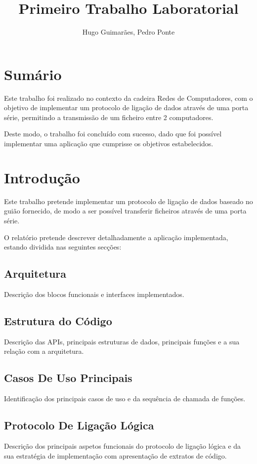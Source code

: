 \documentclass{article}
\author{Hugo Guimarães, Pedro Ponte}
\title{Primeiro Trabalho Laboratorial}
\begin{document}
\tableofcontents

\maketitle 

\pagebreak

\section*{Sumário}

Este trabalho foi realizado no contexto da cadeira Redes de Computadores, com o objetivo de implementar um protocolo de  ligação de dados através de uma porta série, permitindo a transmissão de um ficheiro entre 2 computadores.
 
Deste modo, o trabalho foi concluído com sucesso, dado que foi possível implementar uma aplicação que cumprisse os objetivos estabelecidos.


\section{Introdução}
Este trabalho pretende implementar um protocolo de ligação de dados baseado no guião fornecido, de modo a ser possível transferir ficheiros através de uma porta série.

O relatório pretende descrever detalhadamente a aplicação implementada, estando dividida nas seguintes secções:

\subsection{Arquitetura}
Descrição dos blocos funcionais e interfaces implementados.


\subsection{Estrutura do Código}
Descrição das APIs, principais estruturas de dados, principais funções e a sua relação com a arquitetura.

\subsection{Casos De Uso Principais} 
Identificação dos principais casos de uso e da sequência de chamada de funções.

\subsection{Protocolo De Ligação Lógica}
Descrição dos principais aspetos funcionais do protocolo de ligação lógica e da sua estratégia de implementação com apresentação de extratos de código.
\end{document}
